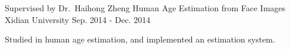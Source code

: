 \begin{cventries}
  \cventry
    {Supervised by Dr.\ Haihong Zheng} %
    {Human Age Estimation from Face Images} %
    {Xidian University} %
    {Sep. 2014 - Dec. 2014} %
    {
      \begin{cvitems} %
        \item {Studied in human age estimation, and implemented an estimation system.}
      \end{cvitems}
    }

\end{cventries}
